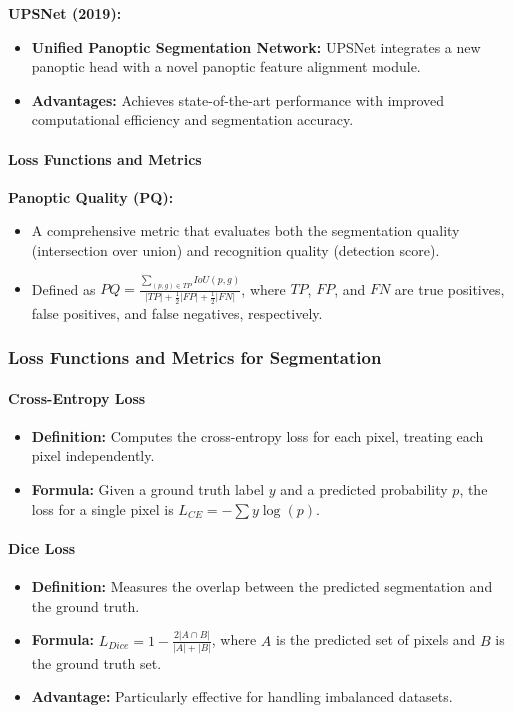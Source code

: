 \documentclass[12pt]{article}
\begin{document}
\textbf{UPSNet (2019):}
\begin{itemize}
    \item \textbf{Unified Panoptic Segmentation Network:} UPSNet integrates a new panoptic head with a novel panoptic feature alignment module.
    \item \textbf{Advantages:} Achieves state-of-the-art performance with improved computational efficiency and segmentation accuracy.
\end{itemize}

\paragraph{Loss Functions and Metrics}

\textbf{Panoptic Quality (PQ):}
\begin{itemize}
    \item A comprehensive metric that evaluates both the segmentation quality (intersection over union) and recognition quality (detection score).
    \item Defined as \(PQ = \frac{\sum_{(p,g) \in TP} IoU(p, g)}{|TP| + \frac{1}{2}|FP| + \frac{1}{2}|FN|}\), where \(TP\), \(FP\), and \(FN\) are true positives, false positives, and false negatives, respectively.
\end{itemize}

\subsubsection{Loss Functions and Metrics for Segmentation}

\paragraph{Cross-Entropy Loss}
\begin{itemize}
    \item \textbf{Definition:} Computes the cross-entropy loss for each pixel, treating each pixel independently.
    \item \textbf{Formula:} Given a ground truth label \(y\) and a predicted probability \(p\), the loss for a single pixel is \(L_{CE} = -\sum y \log(p)\).
\end{itemize}

\paragraph{Dice Loss}
\begin{itemize}
    \item \textbf{Definition:} Measures the overlap between the predicted segmentation and the ground truth.
    \item \textbf{Formula:} \(L_{Dice} = 1 - \frac{2 |A \cap B|}{|A| + |B|}\), where \(A\) is the predicted set of pixels and \(B\) is the ground truth set.
    \item \textbf{Advantage:} Particularly effective for handling imbalanced datasets.
\end{itemize}
\end{document}
